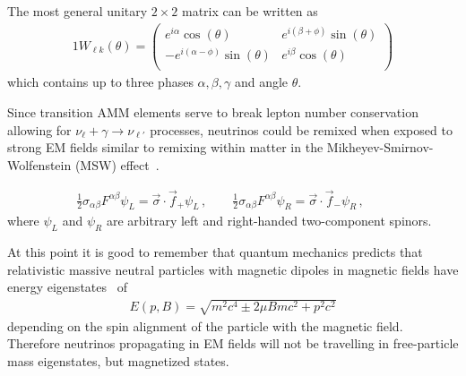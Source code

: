 The most general unitary $2\times2$ matrix can be written as
\begin{alignat}{1}
	\label{mix:4} W_{\ell k}(\theta) = 
    \left(
    \begin{array}{cc}
         e^{i \alpha } \cos (\theta ) & e^{i (\beta +\phi )} \sin (\theta ) \\
         -e^{i (\alpha -\phi )} \sin (\theta ) & e^{i \beta } \cos (\theta ) \\
    \end{array}
    \right)
\end{alignat}
which contains up to three phases $\alpha,\beta,\gamma$ and angle $\theta$.




Since transition AMM elements serve to break lepton number conservation allowing for $\nu_{\ell}+\gamma\rightarrow\nu_{\ell'}$ processes, neutrinos could be remixed when exposed to strong EM fields similar to remixing within matter in the Mikheyev-Smirnov-Wolfenstein (MSW) effect~\citep{Wolfenstein:1977ue,Mikheyev:1985zog}.
    
 \begin{align}
    \label{chiral:1b}
   \frac{1}{2}\sigma_{\alpha\beta}F^{\alpha\beta}\psi_{L} = \vec{\sigma}\cdot\vec{f}_{+}\psi_{L}\,,\qquad
    \frac{1}{2}\sigma_{\alpha\beta}F^{\alpha\beta}\psi_{R} = \vec{\sigma}\cdot\vec{f}_{-}\psi_{R}\,,\qquad
\end{align}
where $\psi_{L}$ and $\psi_{R}$ are arbitrary left and right-handed two-component spinors.




At this point it is good to remember that quantum mechanics predicts that relativistic massive neutral particles with magnetic dipoles in magnetic fields have energy eigenstates~\cite{Steinmetz:2018ryf} of
\begin{align}
    \label{kgp:1}
    E(p,B) = \sqrt{m^{2}c^{4}\pm2\mu Bmc^{2}+p^{2}c^{2}}
\end{align}
depending on the spin alignment of the particle with the magnetic field. Therefore neutrinos propagating in EM fields will not be travelling in free-particle mass eigenstates, but magnetized states.




